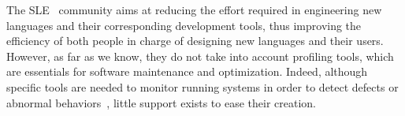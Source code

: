 
The \gls{SLE}~\cite{sle} community aims at reducing the effort required in engineering new languages and their corresponding development tools, thus improving the efficiency of both people in charge of designing new languages and their users. 
However, as far as we know, they do not take into account profiling tools, which are essentials for software maintenance and optimization.
Indeed, although specific tools are needed to monitor running systems in order to detect defects or abnormal behaviors~\cite{duesterwald2000software, Jovic:2011:CMY:2076021.2048081},
little support exists to ease their creation.


